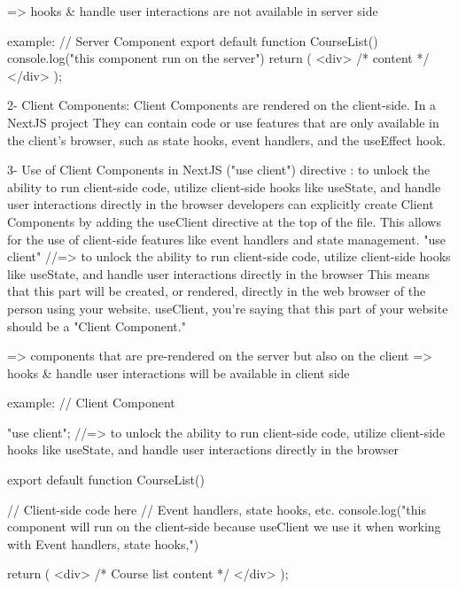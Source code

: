            => hooks & handle user interactions are not available in server side

            example: // Server Component
                    export default function CourseList() {
                        console.log("this component run on the server")
                    return (
                        <div>
                        {/* content */}
                        </div>
                    );
                     }

    2- Client Components: 
        Client Components are rendered on the client-side. In a NextJS project
        They can contain code or use features that are only available in the client's browser, such as state hooks, event handlers, and the useEffect hook.
    
    3- Use of Client Components in NextJS ("use client") directive :
            to unlock the ability to run client-side code, utilize client-side hooks like useState, and handle user interactions directly in the browser
            developers can explicitly create Client Components by adding the useClient directive at the top of the file.
            This allows for the use of client-side features like event handlers and state management.
            "use client" //=> to unlock the ability to run client-side code, utilize client-side hooks like useState, and handle user interactions directly in the browser
            This means that this part will be created, or rendered, directly in the web browser of the person using your website. useClient, you're saying that this part of your website should be a "Client Component." 

            => components that are pre-rendered on the server but also on the client
            => hooks & handle user interactions will be available in client side



            example: // Client Component
                
                "use client"; //=> to unlock the ability to run client-side code, utilize client-side hooks like useState, and handle user interactions directly in the browser

                export default function CourseList() {
                    // Client-side code here
                    // Event handlers, state hooks, etc.
                    console.log("this component will run on the client-side because useClient we use it when working with Event handlers, state hooks,")

                    return (
                        <div>
                        {/* Course list content */}
                        </div>
                    );
                    }

